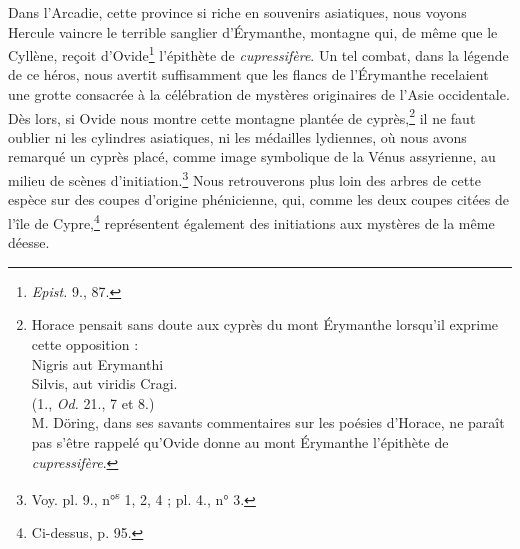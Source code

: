 \documentclass{article}
\begin{document}
Dans l'Arcadie, cette province si riche en souvenirs asiatiques, nous voyons Hercule vaincre le terrible sanglier d'Érymanthe, montagne qui, de même que le Cyllène, reçoit d'Ovide\footnote{\emph{Epist.} 9., 87.} l'épithète de \emph{cupressifère}. Un tel combat, dans la légende de ce héros, nous avertit suffisamment que les flancs de l'Érymanthe recelaient une grotte consacrée à la célébration de mystères originaires de l'Asie occidentale. Dès lors, si Ovide nous montre cette montagne plantée de cyprès,\footnote{Horace pensait sans doute aux cyprès du mont Érymanthe lorsqu'il exprime cette opposition :\\\hspace*{10mm}Nigris aut Erymanthi\\\hspace*{10mm}Silvis, aut viridis Cragi.\\\hspace*{15mm}(1., \emph{Od.} 21., 7 et 8.)\\\hspace*{5mm}M. Döring, dans ses savants commentaires sur les poésies d'Horace, ne paraît pas s'être rappelé qu'Ovide donne au mont Érymanthe l'épithète de \emph{cupressifère}.} il ne faut oublier ni les cylindres asiatiques, ni les médailles lydiennes, où nous avons remarqué un cyprès placé, comme image symbolique de la Vénus assyrienne, au milieu de scènes d'initiation.\footnote{Voy. pl. 9., n°\textsuperscript{s} 1, 2, 4 ; pl. 4., n° 3.} Nous retrouverons plus loin des arbres de cette espèce sur des coupes d'origine phénicienne, qui, comme les deux coupes citées de l'île de Cypre,\footnote{Ci-dessus, p. 95.} représentent également des initiations aux mystères de la même déesse.
\end{document}
